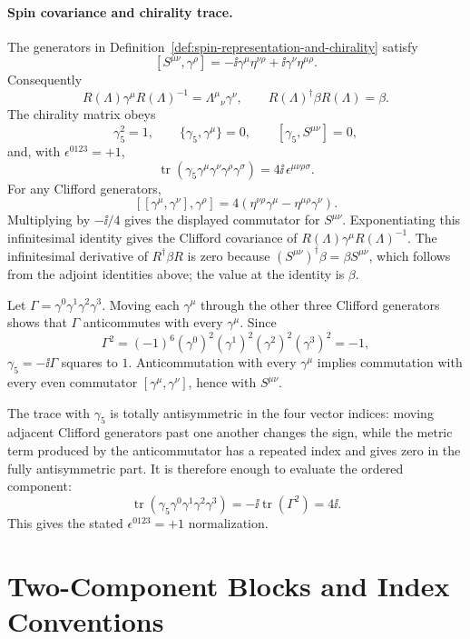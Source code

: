 \paragraph{Spin covariance and chirality trace.}
The generators in Definition~\ref{def:spin-representation-and-chirality}
satisfy
\[
  [S^{\mu\nu},\gamma^\rho]
  =
  -\ii\gamma^\mu\eta^{\nu\rho}
  +\ii\gamma^\nu\eta^{\mu\rho}.
\]
Consequently
\[
  R(\Lambda)\gamma^\mu R(\Lambda)^{-1}
  =
  \Lambda^\mu{}_\nu\gamma^\nu,
  \qquad
  R(\Lambda)^\dagger\beta R(\Lambda)=\beta .
\]
The chirality matrix obeys
\[
  \gamma_5^2=1,\qquad
  \{\gamma_5,\gamma^\mu\}=0,\qquad
  [\gamma_5,S^{\mu\nu}]=0,
\]
and, with \(\epsilon^{0123}=+1\),
\[
  \operatorname{tr}
  (\gamma_5\gamma^\mu\gamma^\nu\gamma^\rho\gamma^\sigma)
  =
  4\ii\,\epsilon^{\mu\nu\rho\sigma}.
\]
For any Clifford generators,
\[
  [[\gamma^\mu,\gamma^\nu],\gamma^\rho]
  =
  4(\eta^{\nu\rho}\gamma^\mu-\eta^{\mu\rho}\gamma^\nu).
\]
Multiplying by \(-\ii/4\) gives the displayed commutator for
\(S^{\mu\nu}\).  Exponentiating this infinitesimal identity gives the
Clifford covariance of \(R(\Lambda)\gamma^\mu R(\Lambda)^{-1}\).
The infinitesimal derivative of \(R^\dagger\beta R\) is zero because
\((S^{\mu\nu})^\dagger\beta=\beta S^{\mu\nu}\), which follows from
the adjoint identities above; the value at the identity is \(\beta\).

Let \(\Gamma=\gamma^0\gamma^1\gamma^2\gamma^3\).  Moving each
\(\gamma^\mu\) through the other three Clifford generators shows that
\(\Gamma\) anticommutes with every \(\gamma^\mu\).  Since
\[
  \Gamma^2=(-1)^6(\gamma^0)^2(\gamma^1)^2(\gamma^2)^2(\gamma^3)^2=-1,
\]
\(\gamma_5=-\ii\Gamma\) squares to \(1\).  Anticommutation with every
\(\gamma^\mu\) implies commutation with every even commutator
\([\gamma^\mu,\gamma^\nu]\), hence with \(S^{\mu\nu}\).

The trace with \(\gamma_5\) is totally antisymmetric in the four vector
indices: moving adjacent Clifford generators past one another changes the
sign, while the metric term produced by the anticommutator has a repeated
index and gives zero in the fully antisymmetric part.  It is therefore enough
to evaluate the ordered component:
\[
  \operatorname{tr}(\gamma_5\gamma^0\gamma^1\gamma^2\gamma^3)
  =
  -\ii\operatorname{tr}(\Gamma^2)
  =
  4\ii .
\]
This gives the stated \(\epsilon^{0123}=+1\) normalization.

\section{Two-Component Blocks and Index Conventions}

